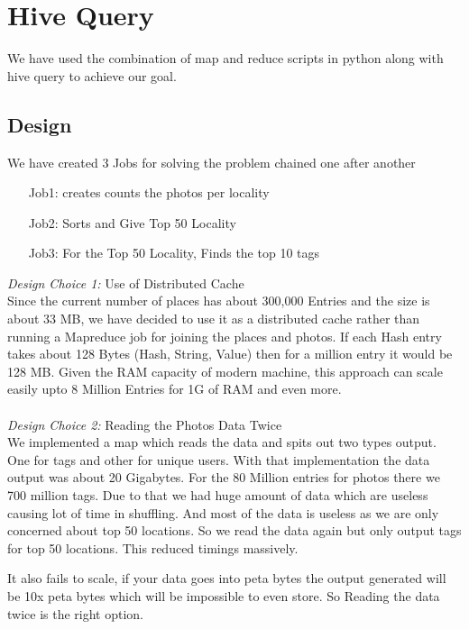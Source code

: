 \chapter{Hive Query}

	We have used the combination of map and reduce scripts in python along with hive query to achieve our goal. 
		
\section{Design}
	We have created 3 Jobs for solving the problem chained one after another \\
	\begin{itemize}
		\item [Job1:] creates counts the photos per locality  
		\item [Job2:] Sorts and Give Top 50 Locality 
		\item [Job3:] For the Top 50 Locality, Finds the top 10 tags 
	\end{itemize}

	
	\emph{Design Choice 1:}  Use of Distributed Cache \\
		Since the current number of places has about 300,000 Entries and the size is about 33 MB, we have decided to use it as a distributed cache rather than running a Mapreduce job for joining the places and photos. If each Hash entry takes about 128 Bytes (Hash, String, Value) then for a million entry it would be 128 MB. Given the RAM capacity of modern machine, this approach can scale easily upto 8 Million Entries for 1G of RAM and even more. \\
		\\
	\emph{Design Choice 2:} Reading the Photos Data Twice \\
	 	We implemented a map which reads the data and spits out two types output. One for tags and other for unique users. With that implementation the data output was about 20 Gigabytes. For the 80 Million entries for photos there we 700 million tags. Due to that we had huge amount of data which are useless causing lot of time in shuffling. And most of the data is useless as we are only concerned about top 50 locations. So we read the data again but only output tags for top 50 locations. This reduced timings massively.
	 	
	 	It also fails to scale, if your data goes into peta bytes the output generated will be 10x peta bytes which will be impossible to even store. So Reading the data twice is the right option.

